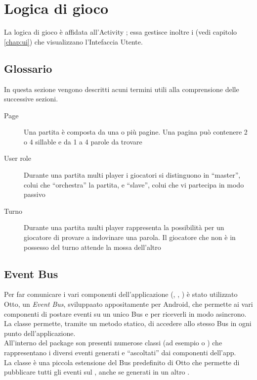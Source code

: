 


\chapter{Logica di gioco}

\label{chap:game_logic}

La logica di gioco è affidata all'Activity ; essa gestisce inoltre i  (vedi capitolo \ref{chap:ui}) che visualizzano l'Intefaccia Utente.

\section{Glossario}
\label{sec:glossary}
In questa sezione vengono descritti acuni termini utili alla comprensione delle successive sezioni.

\begin{description}
\item[Page] Una partita è composta da una o più pagine. Una pagina può contenere 2 o 4 sillable e da 1 a 4 parole da trovare
\item[User role] Durante una partita multi player i giocatori si distinguono in ``master'', colui che ``orchestra'' la partita, e ``slave'', colui che vi partecipa in modo passivo 
\item[Turno] Durante una partita multi player rappresenta la possibilità per un giocatore di provare a indovinare una parola. Il giocatore che non è in possesso del turno attende la mossa dell'altro
\end{description}

\section{Event Bus}
\label{sec:event_bus}
Per far comunicare i vari componenti dell'applicazione (, , ) è stato utilizzato Otto, un \textit{Event Bus}, sviluppaato appositamente per Android, che permette ai vari componenti di postare eventi su un unico Bus e per riceverli in modo asincrono.\\
La classe  permette, tramite un metodo statico, di accedere allo stesso Bus in ogni punto dell'applicazione.\\
All'interno del package  son presenti numerose classi (ad esempio  o ) che rappresentano i diversi eventi generati e ``ascoltati'' dai componenti dell'app.\\
La classe  è una piccola estensione del Bus predefinito di Otto che permette di pubblicare tutti gli eventi sul , anche se generati in un altro .

